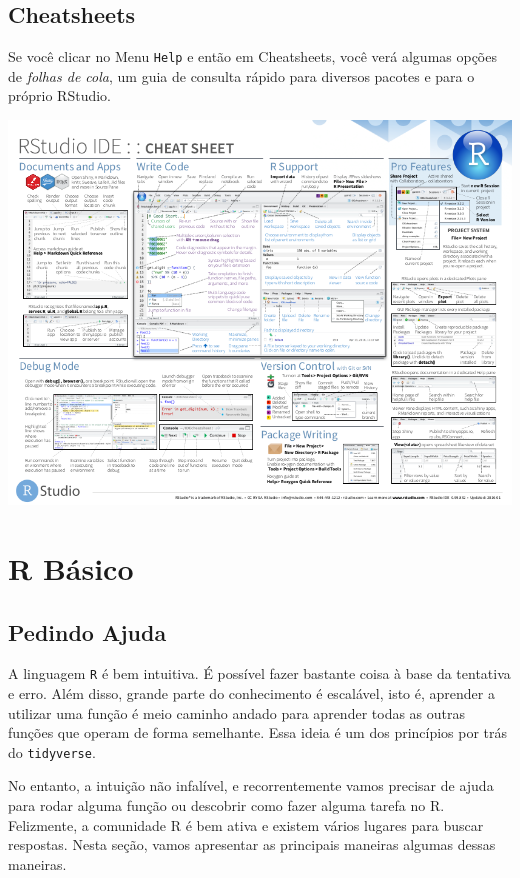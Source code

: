 \documentclass[
]{book}
\begin{document}
\hypertarget{cheatsheets}{%
\section{Cheatsheets}\label{cheatsheets}}

Se você clicar no Menu \texttt{Help} e então em Cheatsheets, você verá algumas opções de \emph{folhas de cola}, um guia de consulta rápido para diversos pacotes e para o próprio RStudio.

\begin{center}\includegraphics[width=11.54in]{img/rstudio/cheatsheet-rstudio} \end{center}

\hypertarget{r-buxe1sico}{%
\chapter{R Básico}\label{r-buxe1sico}}

\hypertarget{pedindo-ajuda}{%
\section{Pedindo Ajuda}\label{pedindo-ajuda}}

A linguagem \texttt{R} é bem intuitiva. É possível fazer bastante coisa à base da tentativa e erro. Além disso, grande parte do conhecimento é escalável, isto é, aprender a utilizar uma função é meio caminho andado para aprender todas as outras funções que operam de forma semelhante. Essa ideia é um dos princípios por trás do \texttt{tidyverse}.

No entanto, a intuição não infalível, e recorrentemente vamos precisar de ajuda para rodar alguma função ou descobrir como fazer alguma tarefa no R. Felizmente, a comunidade R é bem ativa e existem vários lugares para buscar respostas. Nesta seção, vamos apresentar as principais maneiras algumas dessas maneiras.
\end{document}
